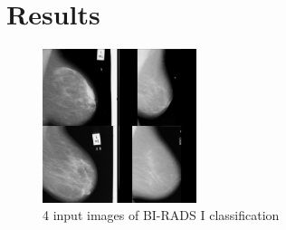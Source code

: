 \documentclass[11pt,fleqn,twoside]{article}
\begin{document}
\newpage
\section{Results}

\begin{figure}[!ht]
  \centering
  \includegraphics[width=0.4\textwidth]{img/big_scan_1.jpg}
  \caption{4 input images of BI-RADS I classification}
  \label{fig:input}
\end{figure}
\end{document}
